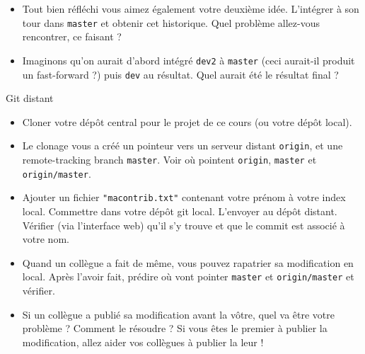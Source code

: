 \documentclass[english, french]{beamer}
\begin{document}
\begin{frame}[allowframebreaks]
\begin{itemize}
{		}
		\item Tout bien réfléchi vous aimez également votre deuxième idée. L’intégrer à son tour dans \texttt{master} et obtenir cet historique. Quel problème allez-vous rencontrer, ce faisant ?\par
		{
			\centering
			\par
		}
		\item Imaginons qu’on aurait d’abord intégré \texttt{dev2} à \texttt{master} (ceci aurait-il produit un fast-forward ?) puis \texttt{dev} au résultat. Quel aurait été le résultat final ?
	\end{itemize}
	\framebreak
	Git distant
	\begin{itemize}
		\item Cloner votre dépôt central pour le projet de ce cours (ou votre dépôt local).
		\item Le clonage vous a créé un pointeur vers un serveur distant \texttt{origin}, et une \og{}remote-tracking branch\fg{} \texttt{master}. Voir où pointent \texttt{origin}, \texttt{master} et \texttt{origin/master}.
		\item Ajouter un fichier \texttt{"macontrib.txt"} contenant votre prénom à votre index local. Commettre dans votre dépôt git local. L’envoyer au dépôt distant. Vérifier (via l’interface web) qu’il s’y trouve et que le commit est associé à votre nom.
		\item Quand un collègue a fait de même, vous pouvez rapatrier sa modification en local. Après l’avoir fait, prédire où vont pointer \texttt{master} et \texttt{origin/master} et vérifier.
		\item Si un collègue a publié sa modification avant la vôtre, quel va être votre problème ? Comment le résoudre ? Si vous êtes le premier à publier la modification, allez aider vos collègues à publier la leur !
	\end{itemize}
\end{frame}
\end{document}
